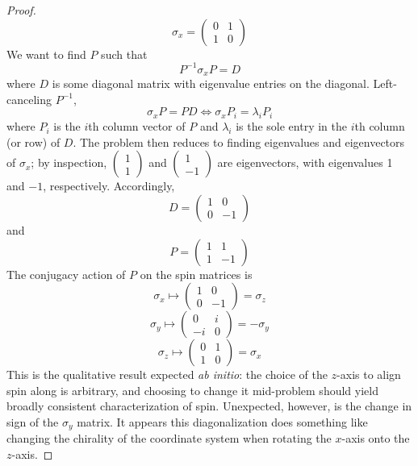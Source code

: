 \documentclass{article}
\begin{document}
\begin{proof}
  \[
    \sigma_{x} =
    \begin{pmatrix}
      0 & 1 \\
      1 & 0
    \end{pmatrix}
  \]
  We want to find $P$ such that
  \[
    P^{-1}\sigma_{x}P = D
  \]
  where $D$ is some diagonal matrix with eigenvalue entries on the diagonal.
  Left-canceling $P^{-1}$,
  \[
    \sigma_{x}P = PD
    \Leftrightarrow  \sigma_{x} P_{i} = \lambda_{i}P_{i}
  \]
  where $P_{i}$ is the $i$th column vector of $P$ and $\lambda_{i}$ is the sole entry in the $i$th column (or row) of $D$.
  The problem then reduces to finding eigenvalues and eigenvectors of $\sigma_{x}$; by inspection,
  $
  \begin{pmatrix}
    1 \\
    1
  \end{pmatrix}
  $
  and
  $
  \begin{pmatrix}
    1 \\
    -1
  \end{pmatrix}
  $
  are eigenvectors, with eigenvalues 1 and $-1$, respectively.
  Accordingly,
  \[
    D =
    \begin{pmatrix}
      1 & 0 \\
      0 & -1
    \end{pmatrix}
  \]
  and
  \[
    P =
    \begin{pmatrix}
      1 & 1 \\
      1 & -1
    \end{pmatrix}
  \]
  The conjugacy action of $P$ on the spin matrices is
  \[
    \sigma_{x} \mapsto
    \begin{pmatrix}
      1 & 0 \\
      0 & -1
    \end{pmatrix}
    = \sigma_{z}
  \]
  \[
    \sigma_{y} \mapsto
    \begin{pmatrix}
      0 & i \\
      -i & 0
    \end{pmatrix}
    = -\sigma_{y}
  \]
  \[
    \sigma_{z} \mapsto
    \begin{pmatrix}
      0 & 1 \\
      1 & 0
    \end{pmatrix}
    = \sigma_{x}
  \]
  This is the qualitative result expected \textit{ab initio}: the choice of the $z$-axis to align spin along is arbitrary,
  and choosing to change it mid-problem should yield broadly consistent characterization of spin.
  Unexpected, however, is the change in sign of the $\sigma_{y}$ matrix.
  It appears this diagonalization does something like changing the chirality of the coordinate system when rotating
  the $x$-axis onto the $z$-axis.
\end{proof}
\end{document}
